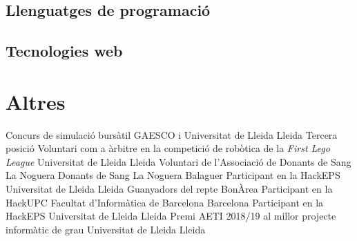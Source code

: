 \documentclass{cv}
\begin{document}
\subsection{Llenguatges de programació}

\subsection{Tecnologies web}

\section{Altres}
	{Concurs de simulació bursàtil}
	{GAESCO i Universitat de Lleida}
	{Lleida}
	{Tercera posició}
	{}
	{Voluntari com a àrbitre en la competició de robòtica de la
		\textit{First Lego League}}
	{Universitat de Lleida}
	{Lleida}
	{}
	{}
	{Voluntari de l'Associació de Donants de Sang La Noguera}
	{Donants de Sang La Noguera}
	{Balaguer}
	{}
	{}
	{Participant en la HackEPS}
	{Universitat de Lleida}
	{Lleida}
	{Guanyadors del repte BonÀrea}
	{} %
	{Participant en la HackUPC}
	{Facultat d'Informàtica de Barcelona}
	{Barcelona}
	{}
	{} %
	{Participant en la HackEPS}
	{Universitat de Lleida}
	{Lleida}
	{}
	{} %
	{Premi AETI 2018/19 al millor projecte informàtic de grau}
	{Universitat de Lleida}
	{Lleida}
	{}
	{} %
\end{document}
